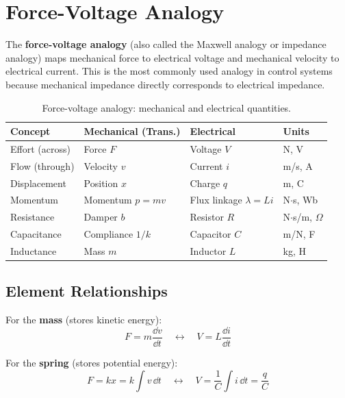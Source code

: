 \section{Force-Voltage Analogy}
\label{sec:force_voltage}

The \textbf{force-voltage analogy} (also called the Maxwell analogy or impedance analogy) maps mechanical force to electrical voltage and mechanical velocity to electrical current. This is the most commonly used analogy in control systems because mechanical impedance directly corresponds to electrical impedance.

\begin{table}[htbp]
\centering
\begin{tabular}{llll}
\toprule
\textbf{Concept} & \textbf{Mechanical (Trans.)} & \textbf{Electrical} & \textbf{Units} \\
\midrule
Effort (across) & Force $F$ & Voltage $V$ & N, V \\
Flow (through) & Velocity $v$ & Current $i$ & m/s, A \\
Displacement & Position $x$ & Charge $q$ & m, C \\
Momentum & Momentum $p = mv$ & Flux linkage $\lambda = Li$ & N$\cdot$s, Wb \\
\midrule
Resistance & Damper $b$ & Resistor $R$ & N$\cdot$s/m, $\Omega$ \\
Capacitance & Compliance $1/k$ & Capacitor $C$ & m/N, F \\
Inductance & Mass $m$ & Inductor $L$ & kg, H \\
\bottomrule
\end{tabular}
\caption{Force-voltage analogy: mechanical and electrical quantities.}
\label{tab:force_voltage}
\end{table}

\subsection{Element Relationships}

For the \textbf{mass} (stores kinetic energy):
\begin{equation}
F = m\frac{\dd v}{\dd t} \quad \longleftrightarrow \quad V = L\frac{\dd i}{\dd t}
\end{equation}

For the \textbf{spring} (stores potential energy):
\begin{equation}
F = kx = k\int v \, \dd t \quad \longleftrightarrow \quad V = \frac{1}{C}\int i \, \dd t = \frac{q}{C}
\end{equation}

